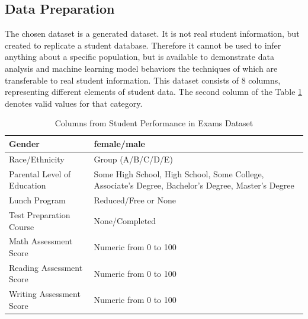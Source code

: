 \documentclass[man,floatsintext]{apa6} %
\begin{document}
\subsection{Data Preparation}
The chosen dataset \cite{dataset} is a generated dataset. It is not real student information, but created to replicate a student database. Therefore it cannot be used to infer anything about a specific population, but is available to demonstrate data analysis and machine learning model behaviors the techniques of which are transferable to real student information. This dataset consists of 8 columns, representing different elements of student data.  The second column of the Table \ref{tab:datasetCol} denotes valid values for that category.
\begin{table}[H]
    \centering
    \caption{Columns from Student Performance in Exams Dataset}
    \begin{tabular}{|l|p{8cm}|}
    \hline
        Gender & female/male\\
        \hline
        Race/Ethnicity & Group (A/B/C/D/E)\\
        \hline
        Parental Level of Education & Some High School, High School, Some College, Associate's Degree, Bachelor's Degree, Master's Degree\\
        \hline
        Lunch Program & Reduced/Free or None\\
        \hline
        Test Preparation Course & None/Completed\\
        \hline
        Math Assessment Score & Numeric from 0 to 100\\
        \hline
        Reading Assessment Score & Numeric from 0 to 100\\
        \hline
        Writing Assessment Score & Numeric from 0 to 100\\
        \hline
    \end{tabular}
    \label{tab:datasetCol}
\end{table}
\end{document}
